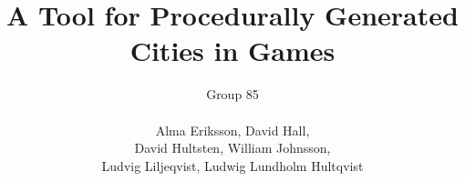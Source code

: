 \pagestyle{empty}

\begin{titlepage}
\title{ \Huge{A Tool for Procedurally Generated Cities in Games} \noindent\makebox[\linewidth]{\textcolor{light-gray}{\rule{\paperwidth}{0.1pt}}}}
\author{\LARGE{{Group 85}} \\\\ 
[0.30cm] Alma Eriksson, David Hall,\\
[0.30cm] David Hultsten, William Johnsson,\\
[0.30cm] Ludvig Liljeqvist, Ludwig Lundholm Hultqvist
\\[0.1cm]}
\maketitle
\thispagestyle{empty}
\end{titlepage}

\clearpage
\maketitle